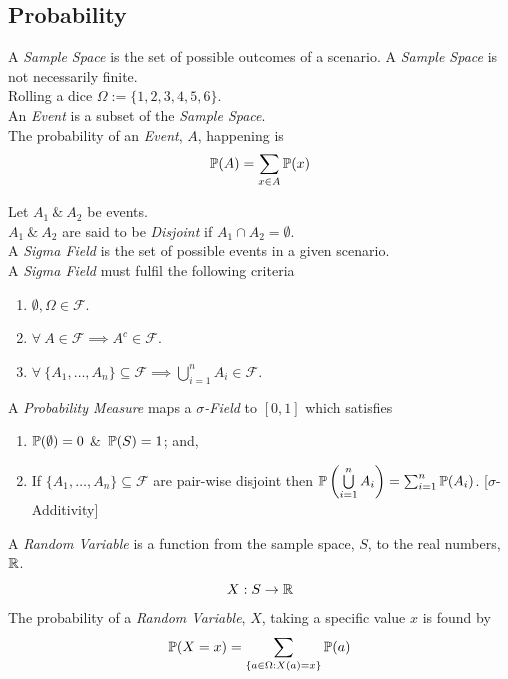 \documentclass[11pt,a4paper]{article}
\begin{document}
\subsection{Probability}

A \textit{Sample Space} is the set of possible outcomes of a scenario. A \textit{Sample Space} is not necessarily finite.\\
\eg Rolling a dice $\Omega:=\{1,2,3,4,5,6\}$.\\

An \textit{Event} is a subset of the \textit{Sample Space}.\\
The probability of an \textit{Event}, $A$, happening is
$$\mathbb{P}(A)=\sum_{x\in A}\mathbb{P}(x)$$

Let $A_1\ \&\ A_2$ be events.\\
$A_1\ \&\ A_2$ are said to be \textit{Disjoint} if $A_1\cap A_2=\emptyset$.\\

A \textit{Sigma Field} is the set of possible events in a given scenario.\\
A \textit{Sigma Field} must fulfil the following criteria
\begin{enumerate}
	\item $\emptyset,\Omega\in\mathcal{F}$.
	\item $\forall\ A\in\mathcal{F}\implies A^c\in\mathcal{F}$.
	\item $\forall\ \{A_1,\dots,A_n\}\subseteq\mathcal{F}\implies\bigcup\limits_{i=1}^nA_i\in\mathcal{F}$.
\end{enumerate}

A \textit{Probability Measure} maps a \textit{$\sigma$-Field} to $[0,1]$ which satisfies
\begin{enumerate}
	\item $\mathbb{P}(\emptyset)=0$ \&\ $\mathbb{P}(S)=1$; and,
	\item If $\{A_1,\dots,A_n\}\subseteq\mathcal{F}$ are pair-wise disjoint then $\mathbb{P}\left(\bigcup\limits_{i=1}^nA_i\right)=\sum_{i=1}^n\mathbb{P}(A_i)$. [$\sigma$-Additivity]
\end{enumerate}

A \textit{Random Variable} is a function from the sample space, $S$, to the real numbers, $\mathbb{R}$.\\
$$X:S\to\mathbb{R}$$
The probability of a \textit{Random Variable}, $X$, taking a specific value $x$ is found by
$$\mathbb{P}(X=x)=\sum_{\{a\in \Omega:X(a)=x\}}\mathbb{P}(a)$$
\end{document}
